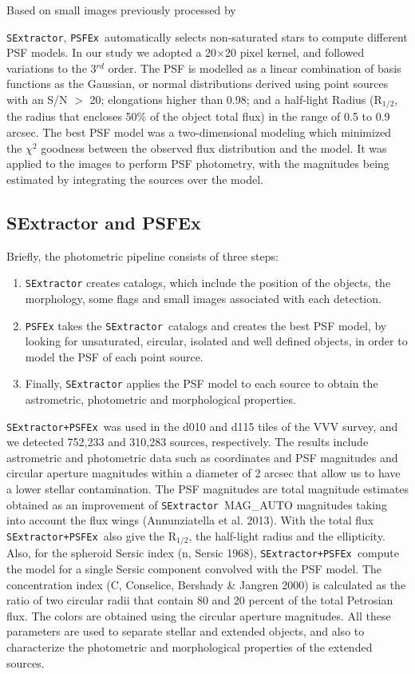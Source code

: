 \documentclass[preprint2]{aastex}
\newcommand{\se}{{\tt SExtractor\ }}
\newcommand{\psf}{{\tt PSFEx\ }}
\newcommand{\dos}{{\tt SExtractor+PSFEx\ }}
\begin{document}
Based on small images previously 
processed 
by {{\tt SExtractor}, \psf automatically selects non-saturated stars to compute
  different PSF models.
In our study we adopted a 20$\times$20 pixel kernel, and followed variations 
to the 3$^{rd}$ order.  The PSF is modelled as a linear combination of basis
functions as the Gaussian, or normal distributions derived 
using point 
sources with an S/N $>$ 20; elongations 
higher than 0.98; and a
half-light Radius (R$_{1/2}$, the radius that 
encloses 50\% of the object total flux) in the range of 0.5 to 0.9 arcsec.  
The best PSF model was a 
two-dimensional modeling which minimized the $\chi^2$ goodness between the 
observed flux distribution and the model.  It was applied to the images
to perform PSF photometry, with the magnitudes being estimated by integrating
the sources over the model.

\subsection{\bf{SExtractor and PSFEx} }

Briefly, the photometric pipeline  consists of three  steps: 

	\begin{enumerate}
		\item {\tt SExtractor} creates catalogs,
		 which include the position of the objects, the morphology, 
some flags and small images associated with each detection.
		\item {\tt PSFEx} takes the  \se catalogs and creates 
the best PSF model, by looking for unsaturated, circular,
		isolated and well defined objects, in order to model the PSF of each point source.  
	      \item Finally, {\tt SExtractor} applies the PSF model to
                each source to obtain the astrometric, photometric
                and morphological properties. 
	\end{enumerate}

        \dos was used in the d010 and d115 tiles of the VVV survey, and we  
detected 752,233 and 310,283  sources, respectively. 
 The results include astrometric and photometric data 
 such as coordinates and PSF magnitudes and  circular aperture magnitudes
 within a diameter of 
2 arcsec  that allow us to have a lower stellar contamination.  The PSF magnitudes are total magnitude estimates
obtained as an improvement of \se MAG\_AUTO magnitudes taking into account
the flux wings (Annunziatella et al. 2013).   With the total flux \dos also
give the R$_{1/2}$, the half-light radius and the ellipticity.  Also, for the
spheroid Sersic index (n, Sersic 1968), \dos compute the model for a single
Sersic component convolved with the PSF model.  The concentration index (C,
Conselice, Bershady \& Jangren 2000) is calculated as the ratio of two circular
radii that contain 80 and 20 percent of the total Petrosian flux.
The colors are obtained using the circular aperture magnitudes.
  All these parameters are used 
to separate stellar and extended objects, and also
to characterize the photometric
and morphological properties of the extended sources.    


}
\end{document}
